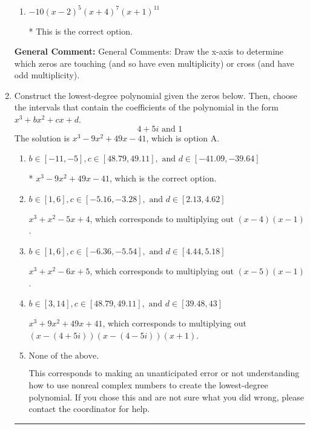 \documentclass{extbook}[14pt]
\newcommand{\litem}[1]{\item #1

\rule{\textwidth}{0.4pt}}
\begin{document}
\begin{enumerate}
{\begin{enumerate}[label=\Alph*.]
This corresponds to the leading coefficient being the opposite value than it should be.
\item \( -10(x - 2)^{5} (x + 4)^{7} (x + 1)^{11} \)

* This is the correct option.
\end{enumerate}

\textbf{General Comment:} General Comments: Draw the x-axis to determine which zeros are touching (and so have even multiplicity) or cross (and have odd multiplicity).
}
\litem{
Construct the lowest-degree polynomial given the zeros below. Then, choose the intervals that contain the coefficients of the polynomial in the form $x^3+bx^2+cx+d$.
\[ 4 + 5 i \text{ and } 1 \]The solution is \( x^{3} -9 x^{2} +49 x -41 \), which is option A.\begin{enumerate}[label=\Alph*.]
\item \( b \in [-11, -5], c \in [48.79, 49.11], \text{ and } d \in [-41.09, -39.64] \)

* $x^{3} -9 x^{2} +49 x -41$, which is the correct option.
\item \( b \in [1, 6], c \in [-5.16, -3.28], \text{ and } d \in [2.13, 4.62] \)

$x^{3} + x^{2} -5 x + 4$, which corresponds to multiplying out $(x -4)(x -1)$.
\item \( b \in [1, 6], c \in [-6.36, -5.54], \text{ and } d \in [4.44, 5.18] \)

$x^{3} + x^{2} -6 x + 5$, which corresponds to multiplying out $(x -5)(x -1)$.
\item \( b \in [3, 14], c \in [48.79, 49.11], \text{ and } d \in [39.48, 43] \)

$x^{3} +9 x^{2} +49 x + 41$, which corresponds to multiplying out $(x-(4 + 5 i))(x-(4 - 5 i))(x + 1)$.
\item \( \text{None of the above.} \)

This corresponds to making an unanticipated error or not understanding how to use nonreal complex numbers to create the lowest-degree polynomial. If you chose this and are not sure what you did wrong, please contact the coordinator for help.
\end{enumerate}

}
\end{enumerate}
\end{document}
